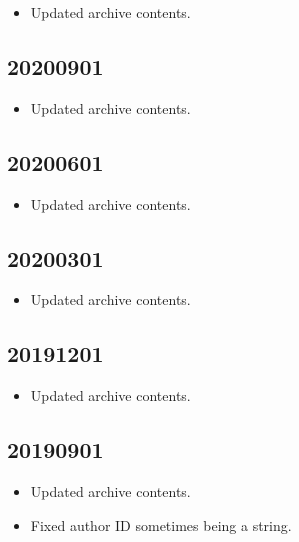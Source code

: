 \documentclass[hidelinks,a4paper,12pt]{article}
\begin{document}
\begin{itemize}
\item Updated archive contents.
\end{itemize}

\subsection{20200901}  \label{sec:changelog_20200901}

\begin{itemize}
\item Updated archive contents.
\end{itemize}

\subsection{20200601}  \label{sec:changelog_20200601}

\begin{itemize}
\item Updated archive contents.
\end{itemize}

\subsection{20200301}  \label{sec:changelog_20200301}

\begin{itemize}
\item Updated archive contents.
\end{itemize}

\subsection{20191201}  \label{sec:changelog_20191201}

\begin{itemize}
\item Updated archive contents.
\end{itemize}

\subsection{20190901}  \label{sec:changelog_20190901}

\begin{itemize}
\item Updated archive contents.
\item Fixed author ID sometimes being a string.
\end{itemize}
\end{document}
